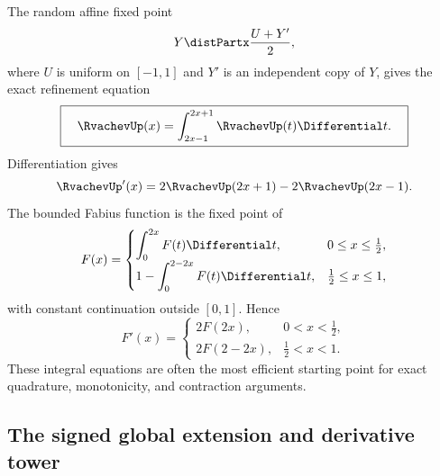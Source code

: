 \documentclass[11pt]{article}
\theoremstyle{definition}
\theoremstyle{remark}
\begin{document}
The random affine fixed point
\begin{equation}
 Y\distPartx\frac{U+Y'}2,                                    \label{p2:eq:random-fixed}
\end{equation}
where $U$ is uniform on $[-1,1]$ and $Y'$ is an independent copy of $Y$, gives the exact
refinement equation
\begin{equation}
 \boxed{\quad
 \RvachevUp(x)=\int_{2x-1}^{2x+1}\RvachevUp(t)\Differential t.
 \quad}                                                  \label{p2:eq:up-integral-refinement}
\end{equation}
Differentiation gives
\begin{equation}
 \RvachevUp'(x)=2\RvachevUp(2x+1)-2\RvachevUp(2x-1).                         \label{p2:eq:up-differential-refinement}
\end{equation}
The bounded Fabius function is the fixed point of
\begin{equation}
 F(x)=
 \begin{cases}
 \displaystyle\int_0^{2x}F(t)\Differential t,&0\le x\le\tfrac12,\\[1ex]
 \displaystyle1-\int_0^{2-2x}F(t)\Differential t,&\tfrac12\le x\le1,
 \end{cases}                                            \label{p2:eq:F-fixed}
\end{equation}
with constant continuation outside $[0,1]$.  Hence
\begin{equation}
 F'(x)=
 \begin{cases}
 2F(2x),&0<x<\tfrac12,\\
 2F(2-2x),&\tfrac12<x<1.
 \end{cases}                                            \label{p2:eq:F-diffeq-pieces}
\end{equation}
These integral equations are often the most efficient starting point for exact quadrature,
monotonicity, and contraction arguments.

\subsection{The signed global extension and derivative tower}
\end{document}
